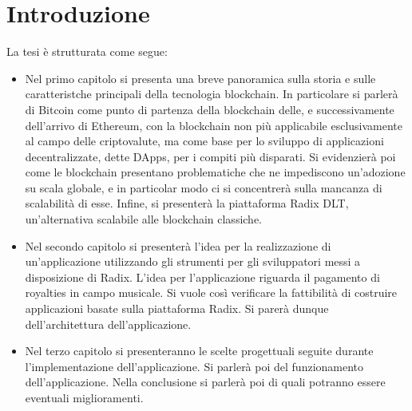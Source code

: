 \chapter*{Introduzione}                 %

La tesi è strutturata come segue:
\begin{itemize}

    \item Nel primo capitolo si presenta una breve panoramica sulla storia e sulle caratteristche principali della tecnologia blockchain. In particolare si parlerà di Bitcoin come punto di partenza della blockchain delle, e successivamente dell'arrivo di Ethereum, con la blockchain non più applicabile esclusivamente al campo delle criptovalute, ma come base per lo sviluppo di applicazioni decentralizzate, dette DApps, per i compiti più disparati. Si evidenzierà poi come le blockchain presentano problematiche che ne impediscono un'adozione su scala globale, e in particolar modo ci si concentrerà sulla mancanza di scalabilità di esse. Infine, si presenterà la piattaforma Radix DLT, un'alternativa scalabile alle blockchain classiche.
    
    \item Nel secondo capitolo si presenterà l'idea per la realizzazione di un'applicazione utilizzando gli strumenti per gli sviluppatori messi a disposizione di Radix. L'idea per l'applicazione riguarda il pagamento di royalties in campo musicale. Si vuole così verificare la fattibilità di costruire applicazioni basate sulla piattaforma Radix. Si parerà dunque dell'architettura dell'applicazione.
    
    \item Nel terzo capitolo si presenteranno le scelte progettuali seguite durante l'implementazione dell'applicazione. Si parlerà poi del funzionamento dell'applicazione. Nella conclusione si parlerà poi di quali potranno essere eventuali miglioramenti.
    
\end{itemize}

\clearpage{\pagestyle{empty}\cleardoublepage}